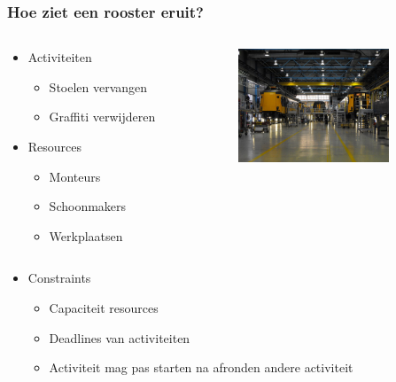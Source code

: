 \begin{frame}\frametitle{Hoe ziet een rooster eruit?}
	\begin{columns}[T]
	    \begin{column}{.4\textwidth}
			\begin{itemize}
		        \item Activiteiten
		        \begin{itemize}
		            \item Stoelen vervangen
		            \item Graffiti verwijderen      
		        \end{itemize}
		        \item Resources
	            \begin{itemize}
	                \item Monteurs
	                \item Schoonmakers
	                \item Werkplaatsen
	            \end{itemize}
		    \end{itemize}
	    \end{column}
	    \begin{column}{.5\textwidth}
	    	\includegraphics[width=4.5cm]{images/werkplaats.jpg}
	    \end{column}
  	\end{columns}
    \begin{itemize}
        \item Constraints
        \begin{itemize}
        	\item Capaciteit resources
            \item Deadlines van activiteiten
            \item Activiteit mag pas starten na afronden andere activiteit 
        \end{itemize}
    \end{itemize}
\end{frame}
